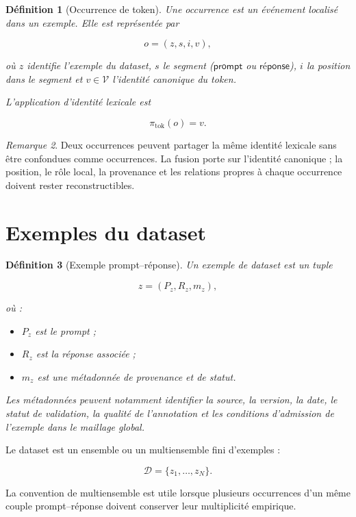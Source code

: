 \documentclass[11pt,a4paper,oneside]{book}
\newtheorem{definition}{Définition}[chapter]
\theoremstyle{remark}
\newtheorem{remarque}[definition]{Remarque}
\newcommand{\Dataset}{\mathcal{D}}
\newcommand{\Tokens}{\mathcal{V}}
\begin{document}
\begin{definition}[Occurrence de token]
Une occurrence est un événement localisé dans un exemple. Elle est
représentée par

\[
o=(z,s,i,v),
\]

où \(z\) identifie l'exemple du dataset, \(s\) le segment
(\(\mathsf{prompt}\) ou \(\mathsf{réponse}\)), \(i\) la position
dans le segment et \(v\in\Tokens\) l'identité canonique du token.

L'application d'identité lexicale est

\[
\pi_{\mathrm{tok}}(o)=v.
\]
\end{definition}

\begin{remarque}
Deux occurrences peuvent partager la même identité lexicale sans
être confondues comme occurrences. La fusion porte sur l'identité
canonique ; la position, le rôle local, la provenance et les relations
propres à chaque occurrence doivent rester reconstructibles.
\end{remarque}

\section{Exemples du dataset}

\begin{definition}[Exemple prompt--réponse]
Un exemple de dataset est un tuple

\[
z=(P_z,R_z,m_z),
\]

où :
\begin{itemize}
  \item \(P_z\) est le prompt ;
  \item \(R_z\) est la réponse associée ;
  \item \(m_z\) est une métadonnée de provenance et de statut.
\end{itemize}

Les métadonnées peuvent notamment identifier la source, la version,
la date, le statut de validation, la qualité de l'annotation et les
conditions d'admission de l'exemple dans le maillage global.
\end{definition}

Le dataset est un ensemble ou un multiensemble fini d'exemples :

\[
\Dataset=\{z_1,\ldots,z_N\}.
\]

La convention de multiensemble est utile lorsque plusieurs occurrences
d'un même couple prompt--réponse doivent conserver leur multiplicité
empirique.
\end{document}
